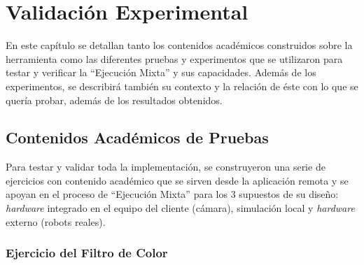 \chapter{ Validación Experimental}

En este capítulo se detallan tanto los contenidos académicos construidos sobre la herramienta como las diferentes pruebas y experimentos que se utilizaron para testar y verificar la ``Ejecución Mixta'' y sus capacidades. Además de los experimentos, se describirá también su contexto y la relación de éste con lo que se quería probar, además de los resultados obtenidos.

\section{Contenidos Académicos de Pruebas}

Para testar y validar toda la implementación, se construyeron una serie de ejercicios con contenido académico que se sirven desde la aplicación remota y se apoyan en el proceso de ``Ejecución Mixta'' para los 3 supuestos de su diseño: \textit{hardware} integrado en el equipo del cliente (cámara), simulación local y \textit{hardware} externo (robots reales).

\subsection{Ejercicio del Filtro de Color}

